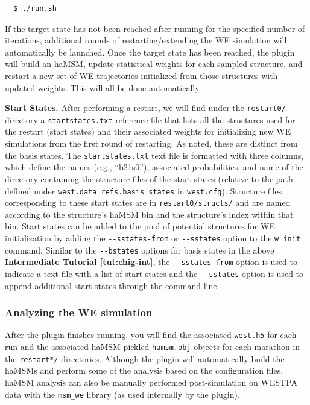 \begin{verbatim}
  $ ./run.sh
\end{verbatim}

If the target state has not been reached after running for the specified number of iterations, additional rounds of restarting/extending the WE simulation will automatically be launched. 
Once the target state has been reached, the plugin will build an haMSM, update statistical weights for each sampled structure, and restart a new set of WE trajectories initialized from those structures with updated weights. 
This will all be done automatically.

\textbf{Start States.} After performing a restart, we will find under the \verb|restart0/| directory a \verb|startstates.txt| reference file that lists all the structures used for the restart (start states) and their associated weights for initializing new WE simulations from the first round of restarting. 
As noted, these are distinct from the basis states. 
The \verb|startstates.txt| text file is formatted with three columns, which define the names (e.g., “b21s0”), associated probabilities, and name of the directory containing the structure files of the start states (relative to the path defined under \verb|west.data_refs.basis_states| in \verb|west.cfg|). 
Structure files corresponding to these start states are in \verb|restart0/structs/| and are named according to the structure’s haMSM bin and the structure’s index within that bin. 
Start states can be added to the pool of potential structures for WE initialization by adding the \verb|--sstates-from| or \verb|--sstates| option to the \verb|w_init| command. 
Similar to the \verb|--bstates| options for basis states in the above \textbf{Intermediate Tutorial \ref{tut:chig-int}}, the \verb|--sstates-from| option is used to indicate a text file with a list of start states and the \verb|--sstates| option is used to append additional start states through the command line.
\vspace{-0.125cm}

\subsubsection{Analyzing the WE simulation}
After the plugin finishes running, you will find the associated \verb|west.h5| for each run and the associated haMSM pickled \verb|hamsm.obj| objects for each marathon in the \verb|restart*/| directories. 
Although the plugin will automatically build the haMSMs and perform some of the analysis based on the configuration files, haMSM analysis can also be manually performed post-simulation on WESTPA data with the \verb|msm_we| library (as used internally by the plugin).

